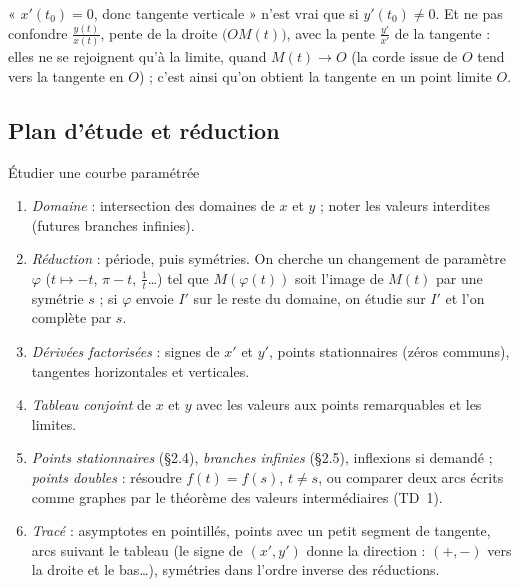 \documentclass[a4paper,11pt]{article}
\numberwithin{equation}{section}
\numberwithin{figure}{section}
\numberwithin{table}{section}
\theoremstyle{enonce}
\theoremstyle{exemple}
\theoremstyle{remarque}
\begin{document}
\begin{attention}
« $x'(t_0)=0$, donc tangente verticale » n'est vrai que si $y'(t_0)\neq0$. Et ne pas confondre $\frac{y(t)}{x(t)}$, pente de la
droite $\big(OM(t)\big)$, avec la pente $\frac{y'}{x'}$ de la tangente : elles ne se rejoignent qu'à la limite, quand $M(t)\to O$
(la corde issue de $O$ tend vers la tangente en $O$) ; c'est ainsi qu'on obtient la tangente en un point limite $O$.
\end{attention}

\subsection{Plan d'étude et réduction}

\begin{methode}{Étudier une courbe paramétrée}\label{meth:plan-courbe}
\begin{enumerate}
\item \emph{Domaine} : intersection des domaines de $x$ et $y$ ; noter les valeurs interdites (futures branches infinies).
\item \emph{Réduction} : période, puis symétries. On cherche un changement de paramètre $\varphi$ ($t\mapsto-t$, $\pi-t$,
      $\frac1t$\dots) tel que $M(\varphi(t))$ soit l'image de $M(t)$ par une symétrie $s$ ; si $\varphi$ envoie $I'$ sur le reste
      du domaine, on étudie sur $I'$ et l'on complète par $s$.
\item \emph{Dérivées factorisées} : signes de $x'$ et $y'$, points stationnaires (zéros communs), tangentes horizontales et
      verticales.
\item \emph{Tableau conjoint} de $x$ et $y$ avec les valeurs aux points remarquables et les limites.
\item \emph{Points stationnaires} (\S2.4), \emph{branches infinies} (\S2.5), inflexions si demandé ; \emph{points doubles} :
      résoudre $f(t)=f(s)$, $t\neq s$, ou comparer deux arcs écrits comme graphes par le théorème des valeurs intermédiaires
      (TD~1).
\item \emph{Tracé} : asymptotes en pointillés, points avec un petit segment de tangente, arcs suivant le tableau (le signe de
      $(x',y')$ donne la direction : $(+,-)$ vers la droite et le bas\dots), symétries dans l'ordre inverse des réductions.
\end{enumerate}
\end{methode}
\end{document}
